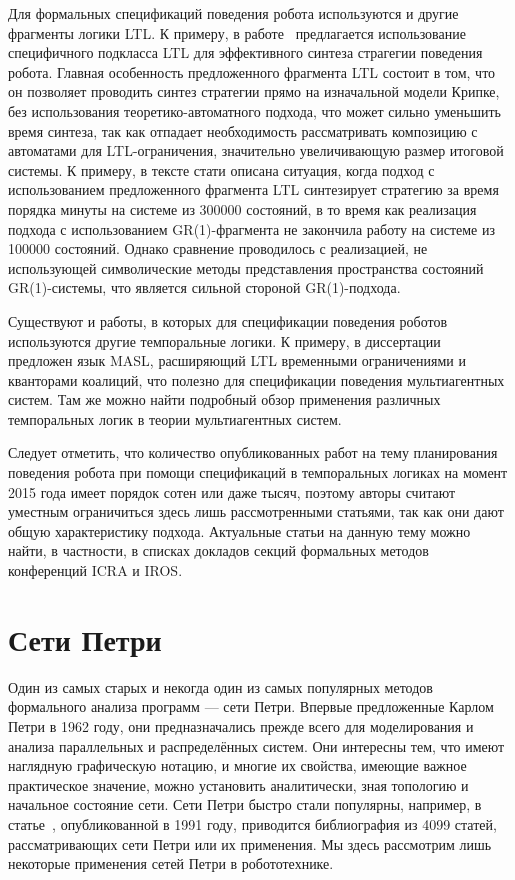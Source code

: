 \documentclass[a4, 14pt]{article}
\begin{document}
Для формальных спецификаций поведения робота используются и другие фрагменты логики LTL.
К примеру, в работе~\cite{wolff2013efficient} предлагается использование специфичного 
подкласса LTL для эффективного синтеза страгегии поведения робота. Главная особенность
предложенного фрагмента LTL состоит в том, что он позволяет проводить синтез стратегии 
прямо на изначальной модели Крипке, без использования теоретико-автоматного подхода,
что может сильно уменьшить время синтеза, так как отпадает необходимость рассматривать
композицию с автоматами для LTL-ограничения, значительно увеличивающую размер итоговой системы.
К примеру, в тексте стати описана ситуация, когда подход с использованием предложенного фрагмента LTL
синтезирует стратегию за время порядка минуты на системе из 300000 состояний, в то время как 
реализация подхода с использованием GR(1)-фрагмента не закончила работу на системе из 100000 состояний.
Однако сравнение проводилось с реализацией, не использующей символические методы представления
пространства состояний GR(1)-системы, что является сильной стороной GR(1)-подхода.

Существуют и работы, в которых для спецификации поведения роботов используются другие темпоральные логики. 
К примеру, в диссертации ~\cite{bugaichenko2007development} предложен язык MASL, расширяющий LTL
временными ограничениями и кванторами коалиций, что полезно для спецификации поведения 
мультиагентных систем. Там же можно найти подробный обзор применения различных темпоральных логик 
в теории мультиагентных систем.

Следует отметить, что количество опубликованных работ на тему планирования 
поведения робота при помощи спецификаций в темпоральных логиках на момент 2015 года имеет порядок 
сотен или даже тысяч, поэтому авторы считают уместным ограничиться здесь лишь рассмотренными 
статьями, так как они дают общую характеристику подхода. Актуальные статьи на 
данную тему можно найти, в частности, в списках докладов секций формальных 
методов конференций ICRA и IROS.

\section{Сети Петри}
Один из самых старых и некогда один из самых популярных методов формального 
анализа программ --- сети Петри. Впервые предложенные Карлом Петри в 1962 году, 
они предназначались прежде всего для моделирования и анализа параллельных и 
распределённых систем. Они интересны тем, что имеют наглядную графическую нотацию, 
и многие их свойства, имеющие важное практическое значение, можно установить 
аналитически, зная топологию и начальное состояние сети. Сети Петри быстро стали 
популярны, например, в статье~\cite{plunnecke1991bibliography}, опубликованной 
в 1991 году, приводится библиография из 4099 статей, рассматривающих сети Петри 
или их применения. Мы здесь рассмотрим лишь некоторые применения сетей Петри 
в робототехнике.
\end{document}
